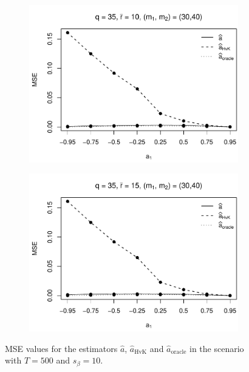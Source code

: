 \begin{figure}[p]
\begin{subfigure}[b]{0.45\textwidth}
\includegraphics[width=\textwidth]{Plots/Robustness/MSE_a1_T=500_slope=10_(q,K1,K2,M1,M2)=(35,2,10,30,40).pdf}
\end{subfigure}
\hspace{0.25cm}
\begin{subfigure}[b]{0.45\textwidth}
\includegraphics[width=\textwidth]{Plots/Robustness/MSE_a1_T=500_slope=10_(q,K1,K2,M1,M2)=(35,2,15,30,40).pdf}
\end{subfigure}
\caption{MSE values for the estimators $\widehat{a}$, $\widehat{a}_{\text{HvK}}$ and $\widehat{a}_{\text{oracle}}$ in the scenario with $T=500$ and $s_\beta=10$.}\label{fig:MSE_slope10_AR_robust} 
\end{figure}


